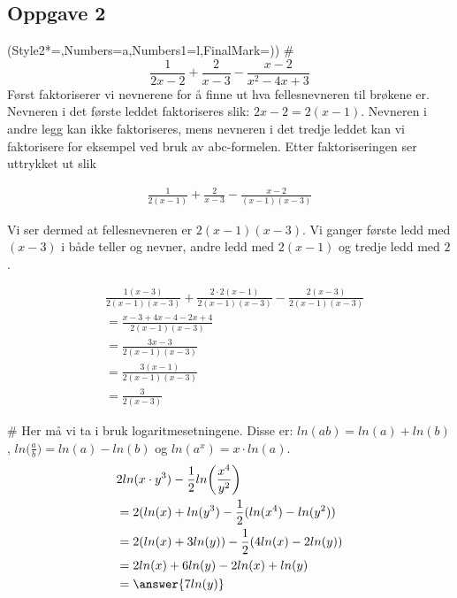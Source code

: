 \subsection*{Oppgave 2}
\begin{easylist}[enumerate]
	\ListProperties(Style2*=,Numbers=a,Numbers1=l,FinalMark={)})
	# 
	\begin{equation*}
		\frac{1}{2x-2} + \frac{2}{x-3} - \frac{x-2}{x^2 - 4x +3}
	\end{equation*}
	Først faktoriserer vi nevnerene for å finne ut hva fellesnevneren til brøkene er. Nevneren i det første leddet faktoriseres slik: $2x-2 = 2(x-1)$. Nevneren i andre legg kan ikke faktoriseres, mens nevneren i det tredje leddet kan vi faktorisere for eksempel ved bruk av abc-formelen. Etter faktoriseringen ser uttrykket ut slik
	
	\begin{equation*}
		\begin{aligned}
			\frac{1}{2(x-1)} + \frac{2}{x-3} - \frac{x-2}{(x-1)(x-3)}
		\end{aligned}
	\end{equation*}
	
	Vi ser dermed at fellesnevneren er $2(x-1)(x-3)$. Vi ganger første ledd med $(x-3)$ i både teller og nevner, andre ledd med $2(x-1)$ og tredje ledd med $2$.
	
	\begin{equation*}
		\begin{aligned}
			&\frac{1(x-3)}{2(x-1)(x-3)} + \frac{2 \cdot 2(x-1)}{2(x-1)(x-3)} - \frac{2(x-3)}{2(x-1)(x-3)} \\
			& = \frac{x - 3 +4x - 4 - 2x + 4}{2(x-1)(x-3)} \\
													& = \frac{3x-3}{2(x-1)(x-3)}\\
													& = \frac{3(x-1)}{2(x-1)(x-3)} \\
													& = \frac{3}{2(x-3)}
		\end{aligned}
	\end{equation*}
	
	# Her må vi ta i bruk logaritmesetningene. Disse er: $ln(ab) = ln(a) + ln(b)$, $ln\big(\frac{a}{b}\big) = ln(a) - ln(b)$ og $ln(a^x) = x \cdot ln(a)$.
	\begin{equation*}
		\begin{aligned}
		&2ln(x\cdot y^3) - \frac{1}{2}ln\bigg(\frac{x^4}{y^2}\bigg) \\
		& = 2(ln(x) + ln(y^3) - \frac{1}{2}(ln(x^4) - ln(y^2)) \\
		& = 2(ln(x) + 3ln(y)) - \frac{1}{2}(4ln(x) - 2ln(y))\\
		& = 2ln(x) + 6ln(y) - 2ln(x) + ln(y)\\
		& = \answer{7ln(y)}
		\end{aligned}
	\end{equation*}
	
\end{easylist}

